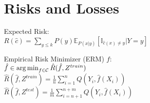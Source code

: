 \section*{Risks and Losses}
Expected Risk:\\ $R(\hat c) = \sum_{y \leq k}P(y)\mathbb{E}_{P(x|y)}[\mathbb{I}_{{\hat c(x) \neq y}}| Y = y]$

Empirical Risk Minimizer (ERM) $\hat{f}$:\\
$\hat{f} \in \operatorname*{arg\,min}_{f \in \mathcal{C}} \hat{R}(\hat{f}, Z^{train})$\\
$\hat{R}(\hat{f}, Z^{train}) = \frac{1}{n} \sum_{i=1}^n Q(Y_i, \hat{f}(X_i))$\\
$\hat{R}(\hat{f}, Z^{test}) = \frac{1}{m} \sum_{i=n+1}^{n+m} Q(Y_i, \hat{f}(X_i))$